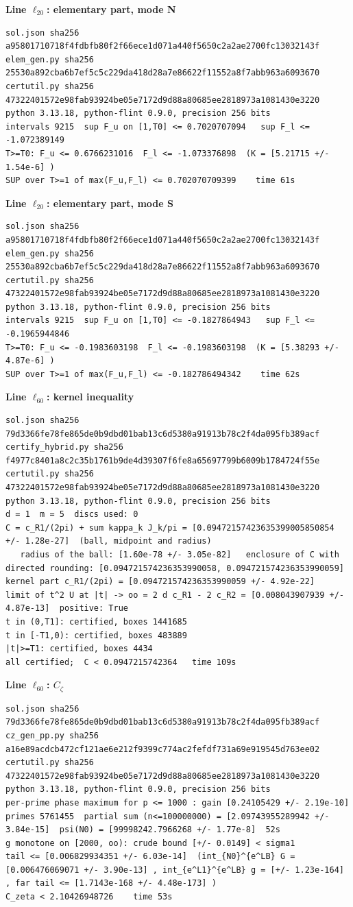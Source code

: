 \documentclass[11pt,reqno]{amsart}
\numberwithin{equation}{section}
\theoremstyle{definition}
\theoremstyle{remark}
\newcommand{\appsub}[1]{\par\medskip\noindent\textbf{#1}\par\nobreak\smallskip}
\begin{document}
\appsub{Line $\ell_{20}$: elementary part, mode N}
\begin{lstlisting}
sol.json sha256 a95801710718f4fdbfb80f2f66ece1d071a440f5650c2a2ae2700fc13032143f
elem_gen.py sha256 25530a892cba6b7ef5c5c229da418d28a7e86622f11552a8f7abb963a6093670
certutil.py sha256 47322401572e98fab93924be05e7172d9d88a80685ee2818973a1081430e3220
python 3.13.18, python-flint 0.9.0, precision 256 bits
intervals 9215  sup F_u on [1,T0] <= 0.7020707094   sup F_l <= -1.072389149
T>=T0: F_u <= 0.6766231016  F_l <= -1.073376898  (K = [5.21715 +/- 1.54e-6] )
SUP over T>=1 of max(F_u,F_l) <= 0.702070709399    time 61s
\end{lstlisting}
\appsub{Line $\ell_{20}$: elementary part, mode S}
\begin{lstlisting}
sol.json sha256 a95801710718f4fdbfb80f2f66ece1d071a440f5650c2a2ae2700fc13032143f
elem_gen.py sha256 25530a892cba6b7ef5c5c229da418d28a7e86622f11552a8f7abb963a6093670
certutil.py sha256 47322401572e98fab93924be05e7172d9d88a80685ee2818973a1081430e3220
python 3.13.18, python-flint 0.9.0, precision 256 bits
intervals 9215  sup F_u on [1,T0] <= -0.1827864943   sup F_l <= -0.1965944846
T>=T0: F_u <= -0.1983603198  F_l <= -0.1983603198  (K = [5.38293 +/- 4.87e-6] )
SUP over T>=1 of max(F_u,F_l) <= -0.182786494342    time 62s
\end{lstlisting}
\appsub{Line $\ell_{60}$: kernel inequality}
\begin{lstlisting}
sol.json sha256 79d3366fe78fe865de0b9dbd01bab13c6d5380a91913b78c2f4da095fb389acf
certify_hybrid.py sha256 f4977c8401a8c2c35b1761b9de4d39307f6fe8a65697799b6009b1784724f55e
certutil.py sha256 47322401572e98fab93924be05e7172d9d88a80685ee2818973a1081430e3220
python 3.13.18, python-flint 0.9.0, precision 256 bits
d = 1  m = 5  discs used: 0 
C = c_R1/(2pi) + sum kappa_k J_k/pi = [0.09472157423635399005850854 +/- 1.28e-27]  (ball, midpoint and radius)
   radius of the ball: [1.60e-78 +/- 3.05e-82]   enclosure of C with directed rounding: [0.094721574236353990058, 0.094721574236353990059]
kernel part c_R1/(2pi) = [0.094721574236353990059 +/- 4.92e-22]
limit of t^2 U at |t| -> oo = 2 d c_R1 - 2 c_R2 = [0.008043907939 +/- 4.87e-13]  positive: True
t in (0,T1]: certified, boxes 1441685
t in [-T1,0): certified, boxes 483889
|t|>=T1: certified, boxes 4434
all certified;  C < 0.0947215742364   time 109s
\end{lstlisting}
\appsub{Line $\ell_{60}$: $C_\zeta$}
\begin{lstlisting}
sol.json sha256 79d3366fe78fe865de0b9dbd01bab13c6d5380a91913b78c2f4da095fb389acf
cz_gen_pp.py sha256 a16e89acdcb472cf121ae6e212f9399c774ac2fefdf731a69e919545d763ee02
certutil.py sha256 47322401572e98fab93924be05e7172d9d88a80685ee2818973a1081430e3220
python 3.13.18, python-flint 0.9.0, precision 256 bits
per-prime phase maximum for p <= 1000 : gain [0.24105429 +/- 2.19e-10]
primes 5761455  partial sum (n<=100000000) = [2.09743955289942 +/- 3.84e-15]  psi(N0) = [99998242.7966268 +/- 1.77e-8]  52s
g monotone on [2000, oo): crude bound [+/- 0.0149] < sigma1
tail <= [0.006829934351 +/- 6.03e-14]  (int_{N0}^{e^LB} G = [0.006476069071 +/- 3.90e-13] , int_{e^L1}^{e^LB} g = [+/- 1.23e-164] , far tail <= [1.7143e-168 +/- 4.48e-173] )
C_zeta < 2.10426948726    time 53s
\end{lstlisting}
\end{document}
